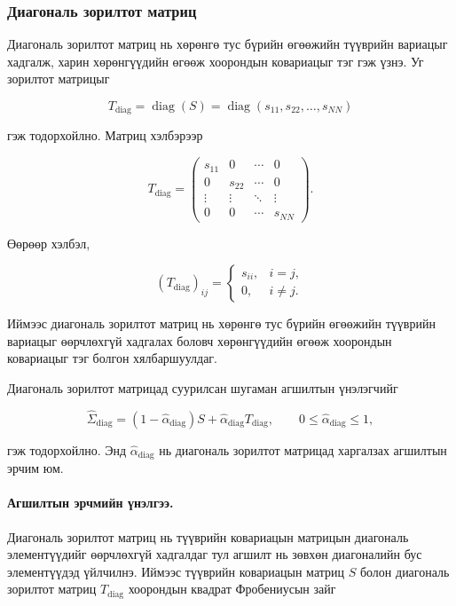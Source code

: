 \subsubsection{Диагональ зорилтот матриц}

Диагональ зорилтот матриц нь хөрөнгө тус бүрийн өгөөжийн
түүврийн вариацыг хадгалж, харин хөрөнгүүдийн өгөөж хоорондын
ковариацыг тэг гэж үзнэ. Уг зорилтот матрицыг

\[
T_{\mathrm{diag}}
=
\operatorname{diag}(S)
=
\operatorname{diag}
(s_{11},s_{22},\ldots,s_{NN})
\]

гэж тодорхойлно. Матриц хэлбэрээр

\[
T_{\mathrm{diag}}
=
\begin{pmatrix}
	s_{11} & 0      & \cdots & 0\\
	0      & s_{22} & \cdots & 0\\
	\vdots & \vdots & \ddots & \vdots\\
	0      & 0      & \cdots & s_{NN}
\end{pmatrix}.
\]

Өөрөөр хэлбэл,

\[
(T_{\mathrm{diag}})_{ij}
=
\begin{cases}
	s_{ii}, & i=j,\\
	0,      & i\neq j.
\end{cases}
\]

Иймээс диагональ зорилтот матриц нь хөрөнгө тус бүрийн
өгөөжийн түүврийн вариацыг өөрчлөхгүй хадгалах боловч
хөрөнгүүдийн өгөөж хоорондын ковариацыг тэг болгон
хялбаршуулдаг.

Диагональ зорилтот матрицад суурилсан шугаман агшилтын
үнэлэгчийг

\[
\widehat{\Sigma}_{\mathrm{diag}}
=
(1-\widehat{\alpha}_{\mathrm{diag}})S
+
\widehat{\alpha}_{\mathrm{diag}}T_{\mathrm{diag}},
\qquad
0\leq\widehat{\alpha}_{\mathrm{diag}}\leq1,
\]

гэж тодорхойлно. Энд
$\widehat{\alpha}_{\mathrm{diag}}$ нь диагональ зорилтот
матрицад харгалзах агшилтын эрчим юм.


\paragraph{Агшилтын эрчмийн үнэлгээ.}

Диагональ зорилтот матриц нь түүврийн ковариацын матрицын
диагональ элементүүдийг өөрчлөхгүй хадгалдаг тул агшилт нь
зөвхөн диагоналийн бус элементүүдэд үйлчилнэ. Иймээс
түүврийн ковариацын матриц $S$ болон диагональ зорилтот
матриц $T_{\mathrm{diag}}$ хоорондын квадрат Фробениусын
зайг

